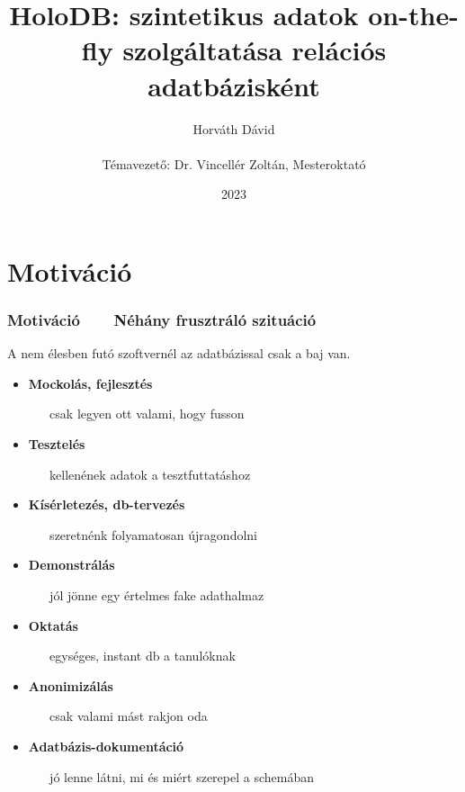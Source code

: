 \documentclass{beamer}
\title[HoloDB]{HoloDB: szintetikus adatok on-the-fly szolgáltatása relációs adatbázisként}
\author[Horváth Dávid]{Horváth Dávid \\ ~ \\ { \footnotesize Témavezető: Dr. Vincellér Zoltán, Mesteroktató }}
\institute[ELTE-IK]{ELTE Informatikai Kar, Információs Rendszerek Tanszék}
\date{2023}
\newcommand{\condpause}{\pause}
\newcommand{\slidetitle}[2]{\frametitle{{\small #1 ~ \ding{226} ~ } #2}}
\begin{document}
\beamertemplatenavigationsymbolsempty

\frame{\titlepage}


\def\sectiontitle{Motiváció}
\section{\sectiontitle}

\def\motintro{A nem élesben futó szoftvernél az adatbázissal csak a baj van.}
\newif\ifmotfirst
\newcommand{\motcommcont}{
	\item \textbf{Mockolás, fejlesztés} \par ~ ~ csak legyen ott valami, hogy fusson \ifmotfirst \condpause \fi
	\item \textbf{Tesztelés} \par ~ ~ kellenének adatok a tesztfuttatáshoz \ifmotfirst \condpause \fi
	\item \textbf{Kísérletezés, db-tervezés} \par ~ ~ szeretnénk folyamatosan újragondolni \ifmotfirst \condpause \fi
	\item \textbf{Demonstrálás} \par ~ ~ jól jönne egy értelmes fake adathalmaz \ifmotfirst \condpause \fi
	\item \textbf{Oktatás} \par ~ ~ egységes, instant db a tanulóknak \ifmotfirst \condpause \fi
	\item \textbf{Anonimizálás} \par ~ ~ csak valami mást rakjon oda \ifmotfirst \condpause \fi
}
\newcommand{\motaftercont}{
	\item \textbf{Adatbázis-dokumentáció} \par ~ ~ jó lenne látni, mi és miért szerepel a schemában
}


\begin{frame}
\slidetitle{\sectiontitle}{Néhány frusztráló szituáció}

\motintro \smallskip \condpause

\motfirsttrue
\begin{itemize}
	\motcommcont
	\smallskip
	\motaftercont
\end{itemize}

\end{frame}
\end{document}
